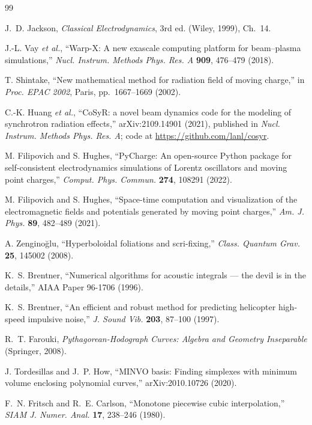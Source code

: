 \documentclass[11pt, a4paper]{article}
\begin{document}
\begin{thebibliography}{99}

J.~D. Jackson, \textit{Classical Electrodynamics}, 3rd ed. (Wiley, 1999), Ch.~14.

J.-L. Vay \textit{et al.}, ``Warp-X: A new exascale computing platform for beam--plasma simulations,'' \textit{Nucl. Instrum. Methods Phys. Res. A} \textbf{909}, 476--479 (2018).

T. Shintake, ``New mathematical method for radiation field of moving charge,'' in \textit{Proc. EPAC 2002}, Paris, pp.~1667--1669 (2002).

C.-K. Huang \textit{et al.}, ``CoSyR: a novel beam dynamics code for the modeling of synchrotron radiation effects,'' arXiv:2109.14901 (2021), published in \textit{Nucl. Instrum. Methods Phys. Res. A}; code at \url{https://github.com/lanl/cosyr}.

M. Filipovich and S. Hughes, ``PyCharge: An open-source Python package for self-consistent electrodynamics simulations of Lorentz oscillators and moving point charges,'' \textit{Comput. Phys. Commun.} \textbf{274}, 108291 (2022).

M. Filipovich and S. Hughes, ``Space-time computation and visualization of the electromagnetic fields and potentials generated by moving point charges,'' \textit{Am. J. Phys.} \textbf{89}, 482--489 (2021).

A. Zengino\u{g}lu, ``Hyperboloidal foliations and scri-fixing,'' \textit{Class. Quantum Grav.} \textbf{25}, 145002 (2008).

K.~S. Brentner, ``Numerical algorithms for acoustic integrals --- the devil is in the details,'' AIAA Paper 96-1706 (1996).

K.~S. Brentner, ``An efficient and robust method for predicting helicopter high-speed impulsive noise,'' \textit{J. Sound Vib.} \textbf{203}, 87--100 (1997).

R.~T. Farouki, \textit{Pythagorean-Hodograph Curves: Algebra and Geometry Inseparable} (Springer, 2008).

J. Tordesillas and J.~P. How, ``MINVO basis: Finding simplexes with minimum volume enclosing polynomial curves,'' arXiv:2010.10726 (2020).

F.~N. Fritsch and R.~E. Carlson, ``Monotone piecewise cubic interpolation,'' \textit{SIAM J. Numer. Anal.} \textbf{17}, 238--246 (1980).


\end{thebibliography}
\end{document}
